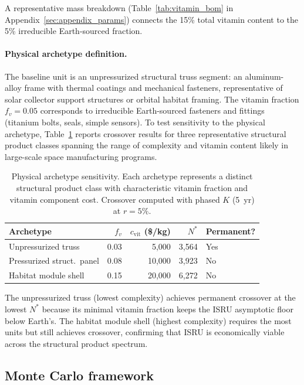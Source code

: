 \documentclass[preprint,12pt]{elsarticle}
\begin{document}
A representative mass breakdown (Table~\ref{tab:vitamin_bom} in Appendix~\ref{sec:appendix_params}) connects the 15\% total vitamin content to the 5\% irreducible Earth-sourced fraction.

\paragraph{Physical archetype definition.}
\label{sec:archetype}
The baseline unit is an unpressurized structural truss segment: an aluminum-alloy frame with thermal coatings and mechanical fasteners, representative of solar collector support structures or orbital habitat framing. The vitamin fraction $f_v = 0.05$ corresponds to irreducible Earth-sourced fasteners and fittings (titanium bolts, seals, simple sensors). To test sensitivity to the physical archetype, Table~\ref{tab:archetype_fv} reports crossover results for three representative structural product classes spanning the range of complexity and vitamin content likely in large-scale space manufacturing programs.

\begin{table}[htbp]
\centering
\caption{Physical archetype sensitivity. Each archetype represents a distinct structural product class with characteristic vitamin fraction and vitamin component cost. Crossover computed with phased $K$ (5~yr) at $r = 5\%$.}
\label{tab:archetype_fv}
\small
\begin{tabular}{@{}lrrrl@{}}
\toprule
Archetype & $f_v$ & $c_{\mathrm{vit}}$ (\$/kg) & $N^*$ & Permanent? \\
\midrule
Unpressurized truss      & 0.03 &  5{,}000 & 3{,}564 & Yes \\
Pressurized struct.\ panel & 0.08 & 10{,}000 & 3{,}923 & No \\
Habitat module shell      & 0.15 & 20{,}000 & 6{,}272 & No \\
\bottomrule
\end{tabular}
\end{table}

The unpressurized truss (lowest complexity) achieves permanent crossover at the lowest $N^*$ because its minimal vitamin fraction keeps the ISRU asymptotic floor below Earth's. The habitat module shell (highest complexity) requires the most units but still achieves crossover, confirming that ISRU is economically viable across the structural product spectrum.

\subsection{Monte Carlo framework}
\end{document}
